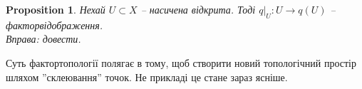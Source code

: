 \documentclass[a4paper, 10pt]{article}
\makeatletter
\def\rightproof{$\boxed{\Rightarrow}$ }
\def\leftproof{$\boxed{\Leftarrow}$ }
\theoremstyle{theoremdd}
\newtheorem{proposition}[theorem]{Proposition}
\renewenvironment{proof}[1][Proof.\\]{\par
\pushQED{\hfill \qed}%
\normalfont \topsep6\p@\@plus6\p@\relax
\trivlist
\item\relax
{\bfseries
#1\@addpunct{.}}\hspace\labelsep\ignorespaces
}{%
\popQED\endtrivlist\@endpefalse
}
\makeatother
\begin{document}
\begin{proposition}
Нехай $U \subset X$ -- насичена відкрита. Тоді $q|_{U} \colon U \to q(U)$ -- факторвідображення.\\
\textit{Вправа: довести.}
\end{proposition}

\iffalse
\begin{proposition}
Задано $(X,\tau)$ -- топологічний простір та $\sim$ -- відношення еквівалентності на $X$.\\
$V \subset X/_\sim$ -- замкнена на $X/_\sim \iff \pi^{-1}(V)$ -- замкнена на $X$.\\
\textit{Вправа: довести.}
\end{proposition}

\begin{proposition}
Задано $(X,\tau)$ -- топологічний простір та $\sim$ -- відношення еквівалентності на $X$. Також нехай $(Y,\sigma)$ -- інший топологічний простір та відображення $f \colon X/_\sim \to Y$.\\
$f$ -- неперервне $\iff f \circ \pi$ -- неперервне.
\end{proposition}

\begin{proof}
\rightproof \textit{випливає з того, що $f,\pi$ одночасно неперервні.}
\bigskip \\
\leftproof Дано: $f \circ \pi$ -- неперервне. Нехай тепер $U$ -- відкрита в $Y$. За умовою, $(f \circ \pi)^{-1}(U)$ відкрита на $X$, але тоді $\pi^{-1} f^{-1}(U)$ відкрита на $X$. Значить, за означенням, $f^{-1}(U)$ -- відкрита на $X/_\sim$.
\end{proof}
\fi
\noindent
Суть фактортопології полягає в тому, щоб створити новий топологічний простір шляхом ''склеювання'' точок. Не прикладі це стане зараз ясніше.
\end{document}
